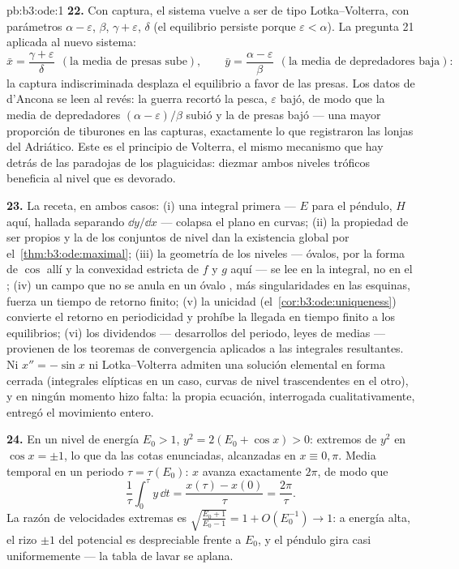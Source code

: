 \begin{solution}{pb:b3:ode:1}
\textbf{22.} Con captura, el sistema vuelve a ser de tipo
Lotka--Volterra, con parámetros $\alpha -
\varepsilon$, $\beta$, $\gamma + \varepsilon$, $\delta$ (el equilibrio
 persiste porque
$\varepsilon <
\alpha$). La pregunta 21 aplicada al nuevo sistema:
\[
\bar x = \frac{\gamma + \varepsilon}{\delta}
\ \ (\text{la media de presas sube}),
\qquad
\bar y = \frac{\alpha - \varepsilon}{\beta}
\ \ (\text{la media de depredadores baja}) :
\]
la captura indiscriminada desplaza el equilibrio a favor de las presas.
Los datos de d'Ancona se leen al revés: la guerra recortó la pesca,
$\varepsilon$ bajó, de modo que la media de depredadores
$(\alpha - \varepsilon)/\beta$ subió y la de presas bajó --- una mayor
proporción de tiburones en las capturas, exactamente lo que registraron
las lonjas del Adriático. Este es el principio de Volterra, el mismo
mecanismo que hay detrás de las paradojas de los plaguicidas: diezmar
ambos niveles tróficos beneficia al nivel que es devorado.

\textbf{23.} La receta, en ambos casos: (i) una integral primera --- $E$
para el péndulo, $H$ aquí, hallada separando $\dd y/\dd x$ --- colapsa
el plano en curvas; (ii) la propiedad de ser propios y la  de
los conjuntos de nivel dan la existencia global por
el~\cref{thm:b3:ode:maximal}; (iii) la geometría de los niveles ---
óvalos, por la forma de $\cos$ allí y la convexidad estricta de $f$ y
$g$ aquí --- se lee en la integral, no en el
; (iv) un campo que no se
anula en un óvalo , más
singularidades  en las esquinas,
fuerza un tiempo de retorno finito; (v) la unicidad
(el~\cref{cor:b3:ode:uniqueness}) convierte el retorno en periodicidad y
prohíbe la llegada en tiempo finito a los equilibrios; (vi) los
dividendos --- desarrollos del periodo, leyes de medias --- provienen de
los teoremas de convergencia aplicados a las integrales resultantes. Ni
$x'' = -\sin x$ ni Lotka--Volterra admiten una solución elemental en
forma cerrada (integrales elípticas en un caso, curvas de nivel
trascendentes en el otro), y en ningún momento hizo falta: la propia
ecuación, interrogada cualitativamente, entregó el movimiento entero.

\textbf{24.} En un nivel de energía $E_0 > 1$, $y^2 = 2(E_0 +
\cos x) > 0$: extremos de $y^2$ en $\cos x = \pm1$, lo que da las cotas
enunciadas, alcanzadas en $x \equiv 0, \pi$. Media temporal en un
periodo $\tau = \tau(E_0)$: $x$ avanza exactamente $2\pi$, de modo que
\[
\frac1\tau\int_0^\tau y\,\dd t = \frac{x(\tau) -
x(0)}{\tau} = \frac{2\pi}\tau .
\]
La razón de velocidades extremas es $\sqrt{\frac{E_0 + 1}{E_0 -
1}} = 1 + O(E_0^{-1}) \to 1$: a energía alta, el rizo $\pm1$ del
potencial es despreciable frente a $E_0$, y el péndulo gira casi
uniformemente --- la tabla de lavar se aplana.


\end{solution}
